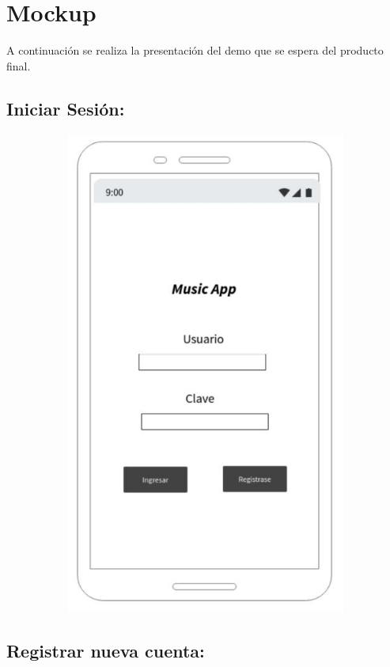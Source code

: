 \section{Mockup}
A continuación se realiza la presentación del demo que se espera del producto final.
\subsection{Iniciar Sesión:}

\begin{figure}[h!]
 \centering
\includegraphics[width=12cm, height=16cm,keepaspectratio=true]{Desarrollo/Interfaces/Mockup/imgs/wire1.JPG}
\end{figure}
\newpage
\subsection{Registrar nueva cuenta:}

